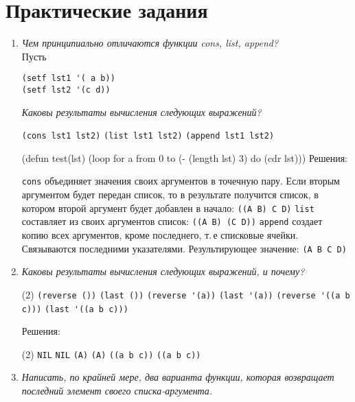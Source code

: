 \chapter{Практические задания}
\begin{enumerate}[wide=0pt]
\item \textit{Чем принципиально отличаются функции cons, list, append?} \\
Пусть 
\begin{lstlisting}
(setf lst1 '( a b))
(setf lst2 '(c d))
\end{lstlisting}
\textit{Каковы результаты вычисления следующих выражений?}
\begin{tasks}[label=\arabic*), item-indent=3pt, after-item-skip=1pt]
	\task \lstinline|(cons lst1 lst2)|
	\task \lstinline|(list lst1 lst2)|
	\task \lstinline|(append lst1 lst2)|
\end{tasks} (defun test(lst) (loop for a from 0 to (- (length lst) 3) do (cdr lst)))
Решения:
\begin{tasks}[label=\arabic*), item-indent=3pt, after-item-skip=1pt]
	\task \lstinline|cons| объединяет значения своих аргументов в точечную пару. Если вторым аргументом будет передан список, то в результате получится список, в котором второй аргумент будет добавлен в начало: \lstinline|((A B) C D)|
	\task \lstinline|list| составляет из своих аргументов список: \lstinline|((A B) (C D))|
	\task \lstinline|append| создает копию всех аргументов, кроме последнего, т.\,е списковые ячейки. Связываются последними указателями. Результирующее значение: \lstinline|(A B C D)|
\end{tasks}
\item \textit{Каковы результаты вычисления следующих выражений, и почему?}
\begin{tasks}[label=\arabic*), item-indent=3pt, after-item-skip=1pt](2)
	\task \lstinline|(reverse ())|
	\task \lstinline|(last ())|
	\task \lstinline|(reverse '(a))|
	\task \lstinline|(last '(a))|
	\task \lstinline|(reverse '((a b c)))|
	\task \lstinline|(last '((a b c)))|
\end{tasks}
Решения:
\begin{tasks}[label=\arabic*), item-indent=3pt, after-item-skip=1pt](2)
	\task \lstinline|NIL|
	\task \lstinline|NIL|
	\task \lstinline|(A)|
	\task \lstinline|(A)|
	\task \lstinline|((a b c))|
	\task \lstinline|((a b c))|
\end{tasks}
\item \textit{Написать, по крайней мере, два варианта функции, которая возвращает последний элемент своего списка-аргумента.}

\end{enumerate}
